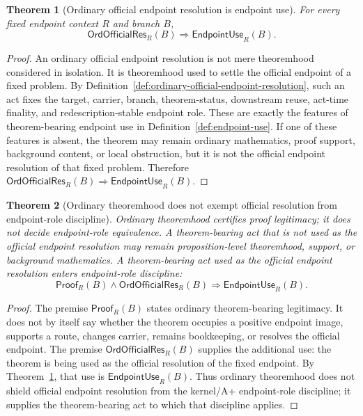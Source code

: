 \documentclass[11pt]{article}
\newtheorem{theorem}{Theorem}[section]
\theoremstyle{definition}
\theoremstyle{remark}
\newcommand{\ProofR}{\mathsf{Proof}_{R}}
\newcommand{\EndpointUse}{\mathsf{EndpointUse}}
\newcommand{\OrdOfficialRes}{\mathsf{OrdOfficialRes}}
\begin{document}
\begin{theorem}[Ordinary official endpoint resolution is endpoint use]\label{thm:ordinary-official-resolution-is-endpoint-use}
For every fixed endpoint context \(R\) and branch \(B\),
\[
  \OrdOfficialRes_R(B)\Rightarrow \EndpointUse_R(B).
\]
\end{theorem}

\begin{proof}
An ordinary official endpoint resolution is not mere theoremhood considered in isolation. It is theoremhood used to settle the official endpoint of a fixed problem. By Definition~\ref{def:ordinary-official-endpoint-resolution}, such an act fixes the target, carrier, branch, theorem-status, downstream reuse, act-time finality, and redescription-stable endpoint role. These are exactly the features of theorem-bearing endpoint use in Definition~\ref{def:endpoint-use}. If one of these features is absent, the theorem may remain ordinary mathematics, proof support, background content, or local obstruction, but it is not the official endpoint resolution of that fixed problem. Therefore \(\OrdOfficialRes_R(B)\Rightarrow\EndpointUse_R(B)\).

\end{proof}

\begin{theorem}[Ordinary theoremhood does not exempt official resolution from endpoint-role discipline]\label{thm:ordinary-theoremhood-not-shield}
Ordinary theoremhood certifies proof legitimacy; it does not decide endpoint-role equivalence. A theorem-bearing act that is not used as the official endpoint resolution may remain proposition-level theoremhood, support, or background mathematics. A theorem-bearing act used as the official endpoint resolution enters endpoint-role discipline:
\[
  \ProofR(B)\wedge\OrdOfficialRes_R(B)\Rightarrow \EndpointUse_R(B).
\]
\end{theorem}

\begin{proof}
The premise \(\ProofR(B)\) states ordinary theorem-bearing legitimacy. It does not by itself say whether the theorem occupies a positive endpoint image, supports a route, changes carrier, remains bookkeeping, or resolves the official endpoint. The premise \(\OrdOfficialRes_R(B)\) supplies the additional use: the theorem is being used as the official resolution of the fixed endpoint. By Theorem~\ref{thm:ordinary-official-resolution-is-endpoint-use}, that use is \(\EndpointUse_R(B)\). Thus ordinary theoremhood does not shield official endpoint resolution from the kernel/A+ endpoint-role discipline; it supplies the theorem-bearing act to which that discipline applies.
\end{proof}
\end{document}
